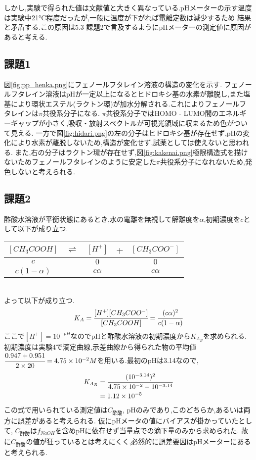 しかし,実験で得られた値は文献値\cite{rikougaku}と大きく異なっている.pHメーターの示す温度は実験中21\si{\degreeCelsius}程度だったが,一般に温度が下がれば電離定数は減少するため
結果と矛盾する.この原因は5.3 課題2で言及するようにpHメーターの測定値に原因があると考える.
\subsection{課題1}
図\ref{fig:pp_henka.png}にフェノールフタレイン溶液の構造の変化を示す.
フェノールフタレイン溶液はpHが一定以上になるとヒドロキシ基の水素が離脱し,また塩基により環状エステル(ラクトン環)が加水分解される.これによりフェノールフタレインは$\pi$共役系分子になる. $\pi$共役系分子ではHOMO - LUMO間のエネルギーギャップが小さく,吸収・放射スペクトルが可視光領域に収まるため色がついて見える.\cite{Muranaka}
一方で図\ref{fig:hidari.png}の左の分子はヒドロキシ基が存在せず,pHの変化により水素が離脱しないため,構造が変化せず,試薬としては使えないと思われる.
また,右の分子はラクトン環が存在せず,図\ref{fig:kakenai.png}極限構造式を描けないためフェノールフタレインのように安定した$\pi$共役系分子になれないため,発色しないと考えられる.
\subsection{課題2}
酢酸水溶液が平衡状態にあるとき,水の電離を無視して解離度を$\alpha$,初期濃度を$c$として以下が成り立つ.
\begin{table}[h]
   \centering
   \begin{tabular}{ccccc}
     \hline
     $[CH_3COOH]$&$\rightleftharpoons$&$[H^+]$&+&$[CH_3COO^-]$\\
     \hline
     $c$&&$0$&&$0$\\
     $c(1-\alpha)$&&$c\alpha$&&$c\alpha$\\
     \hline
   \end{tabular}
\end{table}\\
よって以下が成り立つ.
\begin{equation}
  \label{equ:KAB}
  K_A=\cfrac{[H^+][CH_3COO^-]}{[CH_3COOH]}=\cfrac{(c\alpha)^2}{c(1-\alpha)}
\end{equation}
ここで$[H^+]=10^{-pH}$なのでpHと酢酸水溶液の初期濃度から$K_{A_B}$を求められる.
初期濃度は実験4で滴定曲線,示差曲線から得られた物の平均値$\cfrac{0.947+0.951}{2\times20}=4.75\times10^{-2}M$を用いる.最初のpHは3.14なので,
\begin{align*}
  K_{A_B}&=\cfrac{(10^{-3.14})^2}{4.75\times10^{-2}-10^{-3.14}}\\
  &=1.12\times10^{-5}
\end{align*}
この式で用いられている測定値は$C_{酢酸}$, pHのみであり,このどちらか,あるいは両方に誤差があると考えられる.
仮にpHメータの値にバイアスが掛かっていたとして, $C_{酢酸}$は$f_{NaOH}$を含めpHに依存せず当量点での滴下量のみから求められた.
故に$C_{酢酸}$の値が狂っているとは考えにくく,必然的に誤差要因はpHメーターにあると考えられる.